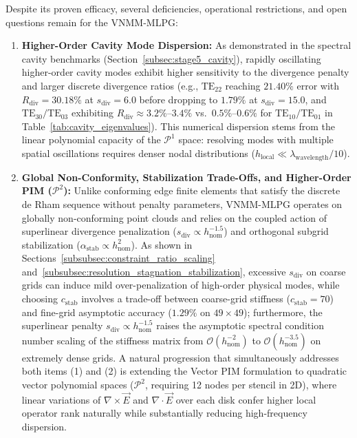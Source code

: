 \documentclass[VANCOUVER,Times1COL]{WileyNJD-v5}
\begin{document}
Despite its proven efficacy, several deficiencies, operational restrictions, and open questions remain for the VNMM-MLPG:
\begin{enumerate}
    \item \textbf{Higher-Order Cavity Mode Dispersion:} As demonstrated in the spectral cavity benchmarks (Section~\ref{subsec:stage5_cavity}), rapidly oscillating higher-order cavity modes exhibit higher sensitivity to the divergence penalty and larger discrete divergence ratios (e.g., $\mathrm{TE}_{22}$ reaching $21.40\%$ error with $R_{\mathrm{div}} = 30.18\%$ at $s_{\mathrm{div}} = 6.0$ before dropping to $1.79\%$ at $s_{\mathrm{div}} = 15.0$, and $\mathrm{TE}_{30}/\mathrm{TE}_{03}$ exhibiting $R_{\mathrm{div}} \approx 3.2\%\text{--}3.4\%$ vs.\ $0.5\%\text{--}0.6\%$ for $\mathrm{TE}_{10}/\mathrm{TE}_{01}$ in Table~\ref{tab:cavity_eigenvalues}). This numerical dispersion stems from the linear polynomial capacity of the $\mathcal{P}^1$ space: resolving modes with multiple spatial oscillations requires denser nodal distributions ($h_{\mathrm{local}} \ll \lambda_{\mathrm{wavelength}} / 10$).
    \item \textbf{Global Non-Conformity, Stabilization Trade-Offs, and Higher-Order PIM ($\mathcal{P}^2$):} Unlike conforming edge finite elements that satisfy the discrete de Rham sequence without penalty parameters, VNMM-MLPG operates on globally non-conforming point clouds and relies on the coupled action of superlinear divergence penalization ($s_{\mathrm{div}} \propto h_{\mathrm{nom}}^{-1.5}$) and orthogonal subgrid stabilization ($\alpha_{\mathrm{stab}} \propto h_{\mathrm{nom}}^2$). As shown in Sections~\ref{subsubsec:constraint_ratio_scaling} and~\ref{subsubsec:resolution_stagnation_stabilization}, excessive $s_{\mathrm{div}}$ on coarse grids can induce mild over-penalization of high-order physical modes, while choosing $c_{\mathrm{stab}}$ involves a trade-off between coarse-grid stiffness ($c_{\mathrm{stab}} = 70$) and fine-grid asymptotic accuracy ($1.29\%$ on $49\times 49$); furthermore, the superlinear penalty $s_{\mathrm{div}} \propto h_{\mathrm{nom}}^{-1.5}$ raises the asymptotic spectral condition number scaling of the stiffness matrix from $\mathcal{O}(h_{\mathrm{nom}}^{-2})$ to $\mathcal{O}(h_{\mathrm{nom}}^{-3.5})$ on extremely dense grids. A natural progression that simultaneously addresses both items (1) and (2) is extending the Vector PIM formulation to quadratic vector polynomial spaces ($\mathcal{P}^2$, requiring 12 nodes per stencil in 2D), where linear variations of $\nabla \times \vec{E}$ and $\nabla \cdot \vec{E}$ over each disk confer higher local operator rank naturally while substantially reducing high-frequency dispersion.

\end{enumerate}
\end{document}
